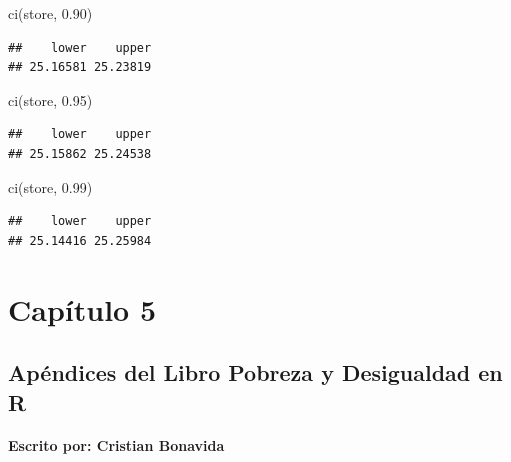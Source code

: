 \documentclass[
]{book}
\newenvironment{Shaded}{\begin{snugshade}}{\end{snugshade}}
\newcommand{\FloatTok}[1]{\textcolor[rgb]{0.00,0.00,0.81}{#1}}
\newcommand{\FunctionTok}[1]{\textcolor[rgb]{0.00,0.00,0.00}{#1}}
\newcommand{\NormalTok}[1]{#1}
\begin{document}
\begin{Shaded}
\begin{Highlighting}[]
\FunctionTok{ci}\NormalTok{(store, }\FloatTok{0.90}\NormalTok{)}
\end{Highlighting}
\end{Shaded}

\begin{verbatim}
##    lower    upper 
## 25.16581 25.23819
\end{verbatim}

\begin{Shaded}
\begin{Highlighting}[]
\FunctionTok{ci}\NormalTok{(store, }\FloatTok{0.95}\NormalTok{)}
\end{Highlighting}
\end{Shaded}

\begin{verbatim}
##    lower    upper 
## 25.15862 25.24538
\end{verbatim}

\begin{Shaded}
\begin{Highlighting}[]
\FunctionTok{ci}\NormalTok{(store, }\FloatTok{0.99}\NormalTok{)}
\end{Highlighting}
\end{Shaded}

\begin{verbatim}
##    lower    upper 
## 25.14416 25.25984
\end{verbatim}

\hypertarget{capuxedtulo-5}{%
\chapter{Capítulo 5}\label{capuxedtulo-5}}

\hypertarget{apuxe9ndices-del-libro-pobreza-y-desigualdad-en-r-3}{%
\section*{Apéndices del Libro Pobreza y Desigualdad en R}\label{apuxe9ndices-del-libro-pobreza-y-desigualdad-en-r-3}}

\hypertarget{escrito-por-cristian-bonavida-3}{%
\subsubsection*{Escrito por: Cristian Bonavida}\label{escrito-por-cristian-bonavida-3}}
\end{document}
